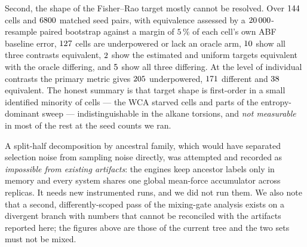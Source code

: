 Second, the shape of the Fisher--Rao target mostly cannot be resolved. Over $144$ cells
and $6800$ matched seed pairs, with equivalence assessed by a $20\,000$-resample paired
bootstrap against a margin of $5\,\%$ of each cell's own ABF baseline error, $127$ cells are
underpowered or lack an oracle arm, $10$ show all three contrasts equivalent, $2$ show
the estimated and uniform targets equivalent with the oracle differing, and $5$ show all
three differing. At the level of individual contrasts the primary metric gives $205$
underpowered, $171$ different and $38$ equivalent. The honest summary is
that target shape is first-order in a small identified minority of cells --- the WCA starved cells
and parts of the entropy-dominant sweep --- indistinguishable in the alkane torsions, and
\emph{not measurable} in most of the rest at the seed counts we ran.

\begin{remark}
A split-half decomposition by ancestral family, which would have separated selection noise from
sampling noise directly, was attempted and recorded as \emph{impossible from existing artifacts}:
the engines keep ancestor labels only in memory and every system shares one global mean-force
accumulator across replicas. It needs new instrumented runs, and we did not run them. We also
note that a second, differently-scoped pass of the mixing-gate analysis exists on a divergent
branch with numbers that cannot be reconciled with the artifacts reported here; the figures above
are those of the current tree and the two sets must not be mixed.
\end{remark}
